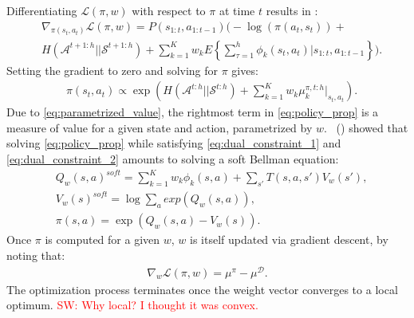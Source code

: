 \documentclass[letterpaper]{article}
\newcommand{\citet}[1]{\citeauthor{#1}~(\citeyear{#1})}
\newcommand{\sw}[1]{\textcolor{red}{SW: #1}}
\newcommand{\sw}[1]{}
\begin{document}
Differentiating $\mathcal{L}(\pi,w)$ with respect to $\pi$ at time $t$ results in \cite[p.\ 186]{ziebart2010modelingthesis}:
\begin{equation}
 \begin{split}
 &\nabla_{\pi(s_t,a_t)}\mathcal{L}(\pi,w) = P(s_{1:t},a_{1:t-1})\Bigg(-\log(\pi(a_t,s_t))+ \\
& H(\mathcal{A}^{t+1:h}||\mathcal{S}^{t+1:h})
 +\sum_{k=1}^K w_kE\left\{\sum_{\tau=1}^h \phi_k(s_t,a_t)|s_{1:t},a_{1:t-1}\right\}\Bigg). \label{eqn:zieb_lagragian_derivative}
 \end{split}
\end{equation}
Setting the gradient to zero and solving for $\pi$ gives:
\begin{equation}
\label{eq:policy_prop}
	\begin{split}
	&\pi(s_t,a_t) \propto \exp\left(H(\mathcal{A}^{t:h}||\mathcal{S}^{t:h})+\sum^K_{k=1} w_k\mu_k^{\pi,t:h}|_{s_t,a_t}\right).
	\end{split}
\end{equation}
Due to \eqref{eq:parametrized_value}, the rightmost term in \eqref{eq:policy_prop} is a measure of value for a given state and action, parametrized by $w$. \citet{ziebart2010modelingthesis} showed that solving \eqref{eq:policy_prop} while satisfying \eqref{eq:dual_constraint_1} and \eqref{eq:dual_constraint_2} amounts to solving a soft Bellman equation:
	\begin{equation}
		\begin{split}
	&Q_w(s,a)^{soft} = \sum_{k=1}^Kw_k\phi_k(s,a) + \sum_{s'}T(s,a,s')V_w(s'),\\	
	&V_w(s)^{soft} = \log\sum_{a}exp(Q_w(s,a)),\\
	&\pi(s,a) = \exp(Q_w(s,a) - V_w(s)).
	\end{split}
	\end{equation}
Once $\pi$ is computed for a given $w$, $w$ is itself updated via gradient descent, by noting that:
 \begin{align}
   \label{eq:weight_update}
   \nabla_{w}\mathcal{L}(\pi,w) =\mu^\pi - \mu^{\mathcal{D}}.
 \end{align}
The optimization process terminates once the weight vector converges to a local optimum. \sw{Why local? I thought it was convex.}
\end{document}
